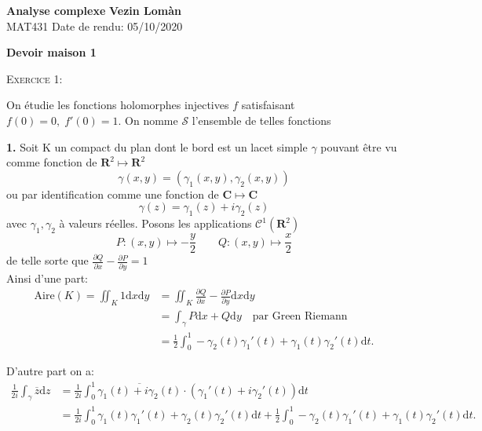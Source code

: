 \documentclass[12pt]{article}
\newenvironment{statement}[1]
{\begin{mdframed}[linewidth=0.6pt]
        \textsc{Exercice #1:}

}
    {\end{mdframed}}
\newcommand{\R}{\mathbf{R}}
\newcommand{\C}{\mathbf{C}}
\newcommand{\de}{\mathrm{d}}
\begin{document}
        \noindent
\textbf{Analyse complexe} \hfill \textbf{Vezin Lomàn}\\
\normalsize MAT431 \hfill Date de rendu: 05/10/2020\\

\begin{center}
\textbf{Devoir maison 1}
\end{center}

\begin{statement}{1}
        On étudie les fonctions holomorphes injectives $f$ satisfaisant $f(0) = 0, \; f'(0) = 1$. On nomme $\mathcal{S}$ l'ensemble de telles fonctions 
\end{statement}

\textbf{1.} Soit K un compact du plan dont le bord est un lacet simple $\gamma$ pouvant être vu comme fonction de $\R^{2} \longmapsto \R^{2}$ \[
        \gamma(x, y) = (\gamma_1(x, y), \gamma_2(x, y))
\] ou par identification comme une fonction de $\C \longmapsto \C$\[
        \gamma(z) = \gamma_1(z) + i\gamma_2(z) 
\] avec $\gamma_1, \gamma_2$ à valeurs réelles. 
Posons les applications $\mathcal{C}^{1}(\R^{2})$ \[
        P : (x, y) \longmapsto -\frac{y}{2} \qquad Q : (x, y) \longmapsto \frac{x}{2}
\] de telle sorte que $\frac{\partial Q}{\partial x} - \frac{\partial P}{\partial y} = 1$ \\
 
Ainsi d'une part:
\begin{align*}
        \text{Aire}(K) = \iint_{K}1\de x\de y &= \iint_{K}\frac{\partial Q}{\partial x} - \frac{\partial P}{\partial y}\de x \de y \\
                                              &= \int_{\gamma} P\de x + Q\de y \quad \text{par Green Riemann} \\
                                              &= \frac{1}{2}\int_{0}^{1}-\gamma_2(t)\gamma_{1}'(t) + \gamma_{1}(t)\gamma_{2}'(t) \de t
.\end{align*}

D'autre part on a:
\begin{align*}
        \frac{1}{2i}\int_{\gamma}\overline{z}\de z &= \frac{1}{2i}\int_{0}^{1}\overline{\gamma_{1}(t) + i \gamma_{2}(t)}\cdot (\gamma_{1}'(t) + i\gamma_{2}'(t))\de t \\
        &= \frac{1}{2i}\int_{0}^{1}\gamma_{1}(t)\gamma_{1}'(t) + \gamma_{2}(t)\gamma_{2}'(t) \de t + \frac{1}{2}\int_{0}^{1}-\gamma_2(t)\gamma_{1}'(t) + \gamma_{1}(t)\gamma_{2}'(t) \de t
.\end{align*}
\end{document}
